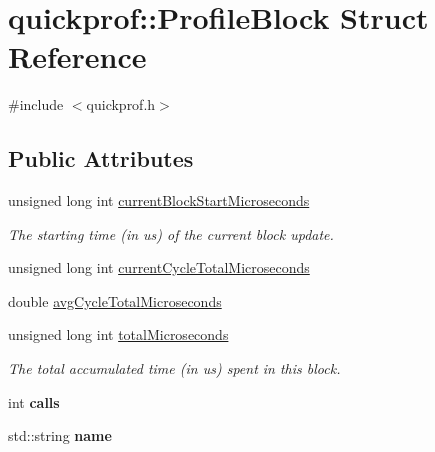 \hypertarget{structquickprof_1_1_profile_block}{
\section{quickprof::ProfileBlock Struct Reference}
\label{structquickprof_1_1_profile_block}
}


{\ttfamily \#include $<$quickprof.h$>$}\subsection*{Public Attributes}
\begin{DoxyCompactItemize}
\item 
\hypertarget{structquickprof_1_1_profile_block_ac46539e1b87378b4b70d9c05862516c6}{
unsigned long int \hyperlink{structquickprof_1_1_profile_block_ac46539e1b87378b4b70d9c05862516c6}{currentBlockStartMicroseconds}}
\label{structquickprof_1_1_profile_block_ac46539e1b87378b4b70d9c05862516c6}

\begin{DoxyCompactList}\small\item\em The starting time (in us) of the current block update. \item\end{DoxyCompactList}\item 
unsigned long int \hyperlink{structquickprof_1_1_profile_block_a21889706502a703740df63f41c1a0cfb}{currentCycleTotalMicroseconds}
\item 
double \hyperlink{structquickprof_1_1_profile_block_a2f49cdcc0d7e85432cd75a3471b8944f}{avgCycleTotalMicroseconds}
\item 
\hypertarget{structquickprof_1_1_profile_block_a799a13d5b5365910a6d71b4a1fa00e74}{
unsigned long int \hyperlink{structquickprof_1_1_profile_block_a799a13d5b5365910a6d71b4a1fa00e74}{totalMicroseconds}}
\label{structquickprof_1_1_profile_block_a799a13d5b5365910a6d71b4a1fa00e74}

\begin{DoxyCompactList}\small\item\em The total accumulated time (in us) spent in this block. \item\end{DoxyCompactList}\item 
\hypertarget{structquickprof_1_1_profile_block_a5c29329ecc5b9ec252160e5d3efaad6c}{
int {\bfseries calls}}
\label{structquickprof_1_1_profile_block_a5c29329ecc5b9ec252160e5d3efaad6c}

\item 
\hypertarget{structquickprof_1_1_profile_block_a8ac02ff4dc86a620289437610bd4d50e}{
std::string {\bfseries name}}
\label{structquickprof_1_1_profile_block_a8ac02ff4dc86a620289437610bd4d50e}

\end{DoxyCompactItemize}


